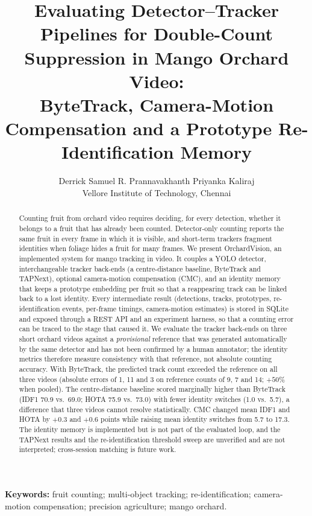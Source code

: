 \documentclass[11pt,a4paper]{article}
\title{\bfseries Evaluating Detector--Tracker Pipelines for Double-Count Suppression in Mango Orchard Video:\\
ByteTrack, Camera-Motion Compensation and a Prototype Re-Identification Memory}
\author{Derrick Samuel R. \qquad Prannavakhanth \qquad Priyanka Kaliraj\\[2pt]
Vellore Institute of Technology, Chennai}
\date{}
\begin{document}
\maketitle

\begin{abstract}
Counting fruit from orchard video requires deciding, for every detection, whether it belongs to a fruit that has already been counted. Detector-only counting reports the same fruit in every frame in which it is visible, and short-term trackers fragment identities when foliage hides a fruit for many frames. We present OrchardVision, an implemented system for mango tracking in video. It couples a YOLO detector, interchangeable tracker back-ends (a centre-distance baseline, ByteTrack and TAPNext), optional camera-motion compensation (CMC), and an identity memory that keeps a prototype embedding per fruit so that a reappearing track can be linked back to a lost identity. Every intermediate result (detections, tracks, prototypes, re-identification events, per-frame timings, camera-motion estimates) is stored in SQLite and exposed through a REST API and an experiment harness, so that a counting error can be traced to the stage that caused it. We evaluate the tracker back-ends on three short orchard videos against a \emph{provisional} reference that was generated automatically by the same detector and has not been confirmed by a human annotator; the identity metrics therefore measure consistency with that reference, not absolute counting accuracy. With ByteTrack, the predicted track count exceeded the reference on all three videos (absolute errors of 1, 11 and 3 on reference counts of 9, 7 and 14; $+50\%$ when pooled). The centre-distance baseline scored marginally higher than ByteTrack (IDF1 70.9 vs.\ 69.0; HOTA 75.9 vs.\ 73.0) with fewer identity switches (1.0 vs.\ 5.7), a difference that three videos cannot resolve statistically. CMC changed mean IDF1 and HOTA by $+0.3$ and $+0.6$ points while raising mean identity switches from 5.7 to 17.3. The identity memory is implemented but is not part of the evaluated loop, and the TAPNext results and the re-identification threshold sweep are unverified and are not interpreted; cross-session matching is future work.
\end{abstract}

\noindent\textbf{Keywords:} fruit counting; multi-object tracking; re-identification; camera-motion compensation; precision agriculture; mango orchard.
\end{document}
